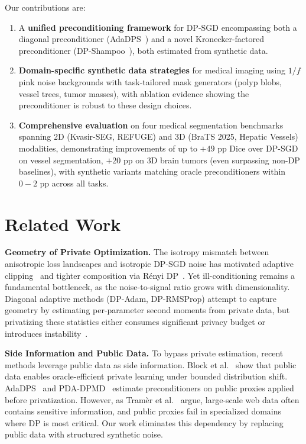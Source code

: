 \documentclass[runningheads]{llncs}
\begin{document}
Our contributions are:
\begin{enumerate}
\item A \textbf{unified preconditioning framework} for DP-SGD encompassing both a diagonal preconditioner (AdaDPS~\cite{Li2022}) and a novel Kronecker-factored preconditioner (DP-Shampoo~\cite{gupta2018shampoo}), both estimated from synthetic data.
\item \textbf{Domain-specific synthetic data strategies} for medical imaging using $1/f$ pink noise backgrounds with task-tailored mask generators (polyp blobs, vessel trees, tumor masses), with ablation evidence showing the preconditioner is robust to these design choices.
\item \textbf{Comprehensive evaluation} on four medical segmentation benchmarks spanning 2D (Kvasir-SEG, REFUGE) and 3D (BraTS 2025, Hepatic Vessels) modalities, demonstrating improvements of up to $+49$ pp Dice over DP-SGD on vessel segmentation, $+20$ pp on 3D brain tumors (even surpassing non-DP baselines), with synthetic variants matching oracle preconditioners within $0{-}2$ pp across all tasks.
\end{enumerate}

\section{Related Work}
\label{sec:related}

\textbf{Geometry of Private Optimization.}
The isotropy mismatch between anisotropic loss landscapes and isotropic DP-SGD noise has motivated adaptive clipping~\cite{andrew2021differentially} and tighter composition via R\'{e}nyi DP~\cite{Mironov_2017}. Yet ill-conditioning remains a fundamental bottleneck, as the noise-to-signal ratio grows with dimensionality. Diagonal adaptive methods (DP-Adam, DP-RMSProp) attempt to capture geometry by estimating per-parameter second moments from private data, but privatizing these statistics either consumes significant privacy budget or introduces instability~\cite{ganesh2025,chen2020understanding}.

\textbf{Side Information and Public Data.}
To bypass private estimation, recent methods leverage public data as side information. Block et al.~\cite{block2024oracle} show that public data enables oracle-efficient private learning under bounded distribution shift. AdaDPS~\cite{Li2022} and PDA-DPMD~\cite{Amid2022} estimate preconditioners on public proxies applied before privatization. However, as Tram\`{e}r et al.~\cite{Tramer2024} argue, large-scale web data often contains sensitive information, and public proxies fail in specialized domains where DP is most critical. Our work eliminates this dependency by replacing public data with structured synthetic noise.
\end{document}
